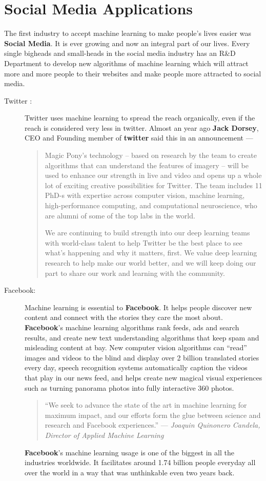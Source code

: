\section{Social Media Applications}
The first industry to accept machine learning to make people's lives easier was \textbf{Social Media}. It is ever growing and now an integral part of our lives.
Every single bigheads and small-heads in the social media industry has an R\&D Department to develop new algorithms of machine learning which will attract more and more people to their websites and make people more attracted to social media.
\begin{description}
	\item[Twitter :]
	Twitter uses machine learning to spread the reach organically, even if the reach is considered very less in twitter. Almost an year ago \textbf{Jack Dorsey}, CEO and Founding member of \textbf{twitter} said this in an announcement ---
	\begin{quotation}
		Magic Pony’s technology – based on research by the team to create algorithms that can understand the features of imagery – will be used to enhance our strength in live and video and opens up a whole lot of exciting creative possibilities for Twitter. The team includes 11 PhD-s with expertise across computer vision, machine learning, high-performance computing, and computational neuroscience, who are alumni of some of the top labs in the world.
		
		We are continuing to build strength into our deep learning teams with world-class talent to help Twitter be the best place to see what’s happening and why it matters, first. We value deep learning research to help make our world better, and we will keep doing our part to share our work and learning with the community.
	\end{quotation}
	\item[Facebook:]
	Machine learning is essential to \textbf{Facebook}. It helps people discover new content and connect with the stories they care the most about. \textbf{Facebook}'s  machine learning algorithms rank feeds, ads and search results, and create new text understanding algorithms that keep spam and misleading content at bay. New computer vision algorithms can “read” images and videos to the blind and display over 2 billion translated stories every day, speech recognition systems automatically caption the videos that play in our news feed, and helps create new magical visual experiences such as turning panorama photos into fully interactive 360 photos.
	\begin{quote}
	 “We seek to advance the state of the art in machine learning for maximum impact, and our efforts form the glue between science and research and Facebook experiences.”
	 ---  \textit{Joaquin Quinonero Candela, Director of Applied Machine Learning}
	\end{quote}
	\textbf{Facebook}'s machine learning usage is one of the biggest in all the industries worldwide. It facilitates around 1.74 billion people everyday all over the world in a way that was unthinkable even two years back.
\end{description}

